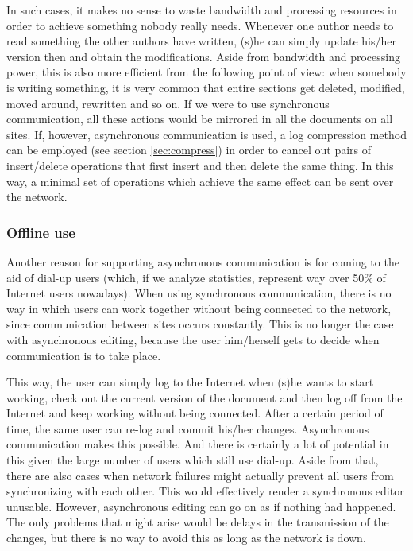 In such cases, it makes no sense to waste bandwidth and processing resources in order to achieve
something nobody really needs. Whenever one author needs to read something the other authors have
written, (s)he can simply update his/her version then and obtain the modifications. Aside from
bandwidth and processing power, this is also more efficient from the following point of view: when
somebody is writing something, it is very common that entire sections get deleted, modified, moved
around, rewritten and so on. If we were to use synchronous communication, all these actions would
be mirrored in all the documents on all sites. If, however, asynchronous communication is used,
a log compression method can be employed (see section \ref{sec:compress}) in order to cancel out
pairs of insert/delete operations that first insert and then delete the same thing. In this way,
a minimal set of operations which achieve the same effect can be sent over the network.

\subsubsection{Offline use}

Another reason for supporting asynchronous communication is for coming to the aid of dial-up users
(which, if we analyze statistics, represent way over 50\% of Internet users nowadays). When using
synchronous communication, there is no way in which users can work together without being connected
to the network, since communication between sites occurs constantly. This is no longer the case with
asynchronous editing, because the user him/herself gets to decide when communication is to take
place.

This way, the user can simply log to the Internet when (s)he wants to start working, check out the
current version of the document and then log off from the Internet and keep working without being
connected. After a certain period of time, the same user can re-log and commit his/her changes.
Asynchronous communication makes this possible. And there is certainly a lot of potential in this
given the large number of users which still use dial-up. Aside from that, there are also cases
when network failures might actually prevent all users from synchronizing with each other. This
would effectively render a synchronous editor unusable. However, asynchronous editing can go on
as if nothing had happened. The only problems that might arise would be delays in the transmission
of the changes, but there is no way to avoid this as long as the network is down.

